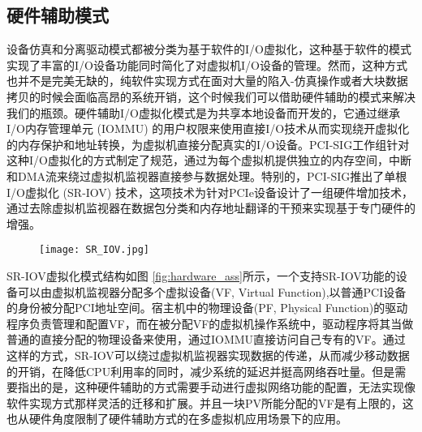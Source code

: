 \subsection{硬件辅助模式}
设备仿真和分离驱动模式都被分类为基于软件的I/O虚拟化，这种基于软件的模式实现了丰富的I/O设备功能同时简化了对虚拟机I/O设备的管理。然而，这种方式也并不是完美无缺的，纯软件实现方式在面对大量的陷入-仿真操作或者大块数据拷贝的时候会面临高昂的系统开销，这个时候我们可以借助硬件辅助的模式来解决我们的瓶颈。硬件辅助I/O虚拟化模式是为共享本地设备而开发的，它通过继承I/O内存管理单元 (IOMMU) 的用户权限来使用直接I/O技术从而实现绕开虚拟化的内存保护和地址转换，为虚拟机直接分配真实的I/O设备。PCI-SIG工作组针对这种I/O虚拟化的方式制定了规范，通过为每个虚拟机提供独立的内存空间，中断和DMA流来绕过虚拟机监视器直接参与数据处理。特别的，PCI-SIG推出了单根I/O虚拟化 (SR-IOV) 技术，这项技术为针对PCIe设备设计了一组硬件增加技术，通过去除虚拟机监视器在数据包分类和内存地址翻译的干预来实现基于专门硬件的增强。
\begin{figure}[!htp]
	\centering
	\texttt{[image: SR\_IOV.jpg]}
\end{figure}
SR-IOV虚拟化模式结构如图 \ref{fig:hardware_ass}所示，一个支持SR-IOV功能的设备可以由虚拟机监视器分配多个虚拟设备(VF, Virtual Function),以普通PCI设备的身份被分配PCI地址空间。宿主机中的物理设备(PF, Physical Function)的驱动程序负责管理和配置VF，而在被分配VF的虚拟机操作系统中，驱动程序将其当做普通的直接分配的物理设备来使用，通过IOMMU直接访问自己专有的VF。通过这样的方式，SR-IOV可以绕过虚拟机监视器实现数据的传递，从而减少移动数据的开销，在降低CPU利用率的同时，减少系统的延迟并挺高网络吞吐量。但是需要指出的是，这种硬件辅助的方式需要手动进行虚拟网络功能的配置，无法实现像软件实现方式那样灵活的迁移和扩展。并且一块PV所能分配的VF是有上限的，这也从硬件角度限制了硬件辅助方式的在多虚拟机应用场景下的应用。



